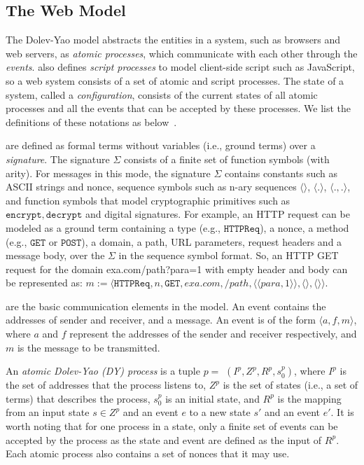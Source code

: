 \subsection{The Web Model}
\label{subsec:webmodel}
The Dolev-Yao model abstracts the entities in a system,
 such as browsers and web servers, as {\em atomic processes},
  which communicate with each other through the {\em events}.
\cite{SPRESSO} also defines {\em script processes} to model client-side script such as JavaScript, so a web system consists of a set of atomic and script processes. The state of a system, called a {\em configuration}, consists of the current states of all atomic processes and all the events that can be accepted by these processes. We list the definitions of these notations as below~\cite{SPRESSO}.

\vspace{1mm}
are defined as formal terms without variables (i.e., ground terms) over a {\em signature}.
The signature $\Sigma$ consists of a finite set of function symbols (with arity). For messages in this mode, the signature $\Sigma$ contains constants such as ASCII strings and nonce, sequence symbols such as n-ary sequences $\langle \rangle$, $\langle . \rangle$, $\langle . ,. \rangle$, and function symbols that model cryptographic primitives such as $\mathtt{encrypt}, \mathtt{decrypt}$ and digital signatures. For example, an HTTP request can be modeled as a ground term containing a type (e.g., $\mathtt{HTTPReq}$), a nonce, a method (e.g., $\mathtt{GET}$ or $\mathtt{POST}$), a domain, a path, URL parameters, request headers and a message body, over the $\Sigma$ in the sequence symbol format. So,
an HTTP GET request for the domain {\sf exa.com/path?para=1} with empty header and body can be represented as: $m:=\langle\mathtt{HTTPReq},n,\mathtt{GET},exa.com,/path,\langle \langle para, 1\rangle \rangle ,\langle \rangle,\langle \rangle \rangle$.

\vspace{1mm}
 are the basic communication elements in the model. An event contains the addresses of sender and receiver, and a message.
An event is of the form $\langle a, f, m \rangle$, where $a$ and $f$ represent the addresses of the sender and receiver respectively, and $m$ is the message to be transmitted.

\vspace{1mm}
 An {\em atomic Dolev-Yao (DY) process} is a tuple $p=$ $(I^p, Z^p, R^p,s_0^p )$, where $I^p$ is the set of addresses that the process listens to, $Z^p$ is the set of states (i.e., a set of terms) that describes the process, $s_0^p$ is an initial state, and $R^p$ is the mapping from an input state $s \in Z^p$ and an event $e$ to a new state $s'$ and an event $e'$. It is worth noting that for one process in a state, only a finite set of events can be accepted by the process as the state and event are defined as the input of $R^p$.
Each atomic process also contains a set of nonces that it may use.


